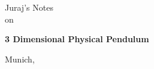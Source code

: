 
\begin{center}




    {\large Juraj's Notes\\
     \medskip on\par}

    \vspace{1cm}

    {\bf\LARGE 3 Dimensional Physical Pendulum\par}



    \vfill

    Munich, \the\year

\end{center}
